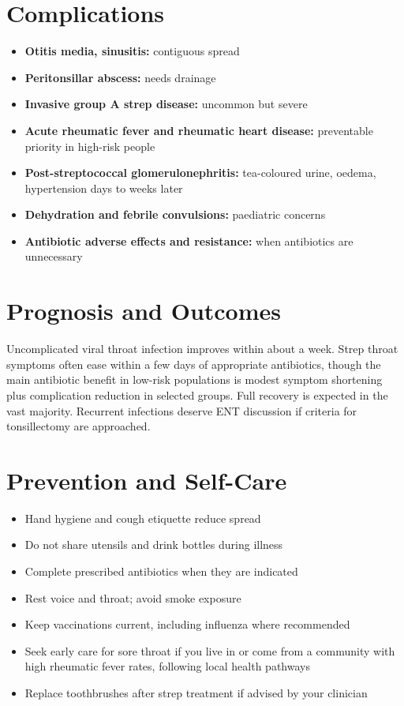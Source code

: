 \section*{Complications}
\begin{itemize}
    \item \textbf{Otitis media, sinusitis:} contiguous spread
    \item \textbf{Peritonsillar abscess:} needs drainage
    \item \textbf{Invasive group A strep disease:} uncommon but severe
    \item \textbf{Acute rheumatic fever and rheumatic heart disease:} preventable priority in high-risk people
    \item \textbf{Post-streptococcal glomerulonephritis:} tea-coloured urine, oedema, hypertension days to weeks later
    \item \textbf{Dehydration and febrile convulsions:} paediatric concerns
    \item \textbf{Antibiotic adverse effects and resistance:} when antibiotics are unnecessary
\end{itemize}

\section*{Prognosis and Outcomes}
Uncomplicated viral throat infection improves within about a week. Strep throat symptoms often ease within a few days of appropriate antibiotics, though the main antibiotic benefit in low-risk populations is modest symptom shortening plus complication reduction in selected groups. Full recovery is expected in the vast majority. Recurrent infections deserve ENT discussion if criteria for tonsillectomy are approached.

\section*{Prevention and Self-Care}
\begin{itemize}
    \item Hand hygiene and cough etiquette reduce spread
    \item Do not share utensils and drink bottles during illness
    \item Complete prescribed antibiotics when they are indicated
    \item Rest voice and throat; avoid smoke exposure
    \item Keep vaccinations current, including influenza where recommended
    \item Seek early care for sore throat if you live in or come from a community with high rheumatic fever rates, following local health pathways
    \item Replace toothbrushes after strep treatment if advised by your clinician
\end{itemize}

